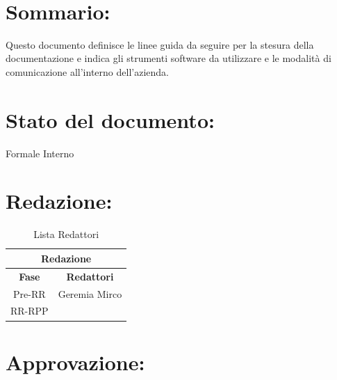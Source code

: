 \newpage

\begin{center} %
	\begin{Huge}	
				\textbf{\TITOLODOC}
			\\
	\end{Huge}
\end{center}

\section*{\LARGE Sommario:} %
\indent \indent
Questo documento definisce le linee guida da seguire per la stesura della documentazione e indica gli strumenti software da utilizzare e le modalit\`a di comunicazione all'interno dell'azienda.

\section*{\LARGE Stato del documento:}
\indent \indent
	Formale Interno

\section*{\LARGE Redazione:}
	\begin{table}[!h]
		\begin{center}
			\begin{tabular}
				{|c|c|}
				\hline
				\multicolumn{2}{|c|}{ \textbf{Redazione} } \\
				\hline
				\textbf{Fase} & \textbf{Redattori} \\
				\hline
				{Pre-RR} &Geremia Mirco \\
				\hline
				{RR-RPP} & \\
				\hline
			\end{tabular}
			\caption{Lista Redattori} %
			\label{tabredazione}
		\end{center}
	\end{table}
	
\section*{\LARGE Approvazione:}

